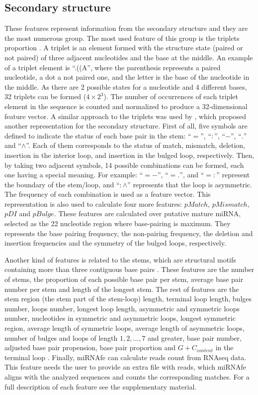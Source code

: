 \documentclass{article}
\begin{document}
\subsection{Secondary structure}
These features represent information from the secondary structure and they are the most numerous group. The most used feature of this group is the triplets
proportion \citep{Xue05}. A triplet is an element formed with the structure state (paired or not paired) of three adjacent nucleotides and the base at the
middle. An example of a triplet element is ``.((A'', where the parenthesis represents a paired nucleotide, a dot a not paired one, and the letter is the base
of the nucleotide in the middle. As there are 2 possible states for a nucleotide and 4 different bases, 32 triplets can be formed ($4 \times 2^{3}$). The
number of occurrences of each triplet element in the sequence is counted and normalized to produce a 32-­dimensional feature vector. A similar approach to the
triplets was used by \cite{Huang07}, which proposed another representation for the secondary structure. First of all, five symbols are defined to indicate the
status of each base pair in the stem: ``$=$'', ``$:$'', ``$-$'', ``$.$'' and ``$\wedge$''. Each of them corresponds to the status of match, mismatch, deletion,
insertion in the interior loop, and insertion in the bulged loop, respectively. Then, by taking two adjacent symbols, 14 possible combinations can be formed,
each one having a special meaning. For example: ``$=-$'', ``$=.$'', and ``$=:$'' represent the boundary of the stem/loop, and ``$:\wedge$'' represents that the
loop is asymmetric. The frequency of each combination is used as a feature vector. This representation is also used to calculate four more features: $pMatch$,
$pMismatch$, $pDI$ and $pBulge$. These features are calculated over putative mature miRNA, selected as the 22 nucleotide region where base-pairing is maximum.
They represents the base pairing frequency, the non-pairing frequency, the deletion and insertion frequencies and the symmetry of the bulged loops,
respectively.

Another kind of features is related to the stems, which are structural motifs containing more than three contiguous base pairs \citep{Ng07}. These features are
the number of stems, the proportion of each possible base pair per stem, average base pair number per stem and length of the longest stem. %
The rest of features are the stem region (the stem part of the stem-loop) length, terminal loop length, bulges number, loops number, longest loop length,
asymmetric and symmetric loops number, nucleotides in symmetric and asymmetric loops, longest symmetric region, average length of symmetric loops, average
length of asymmetric loops, number of bulges and loops of length $1,2,...,7$ and greater, base pair number, adjusted base pair propension, base pair proportion
and  $G+C_{content}$ in the terminal loop \citep{Lopes2014}. %
Finally, miRNAfe can calculate reads count from RNAseq data. This feature needs the user to provide an extra file with reads, which miRNAfe aligns with the
analyzed sequences and counts the corresponding matches. For a full description of each feature see the supplementary material. %
\end{document}
